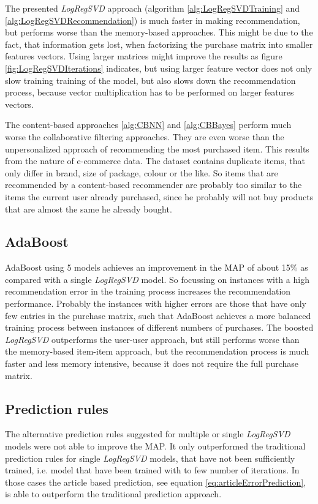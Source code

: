 \documentclass[10pt]{reportMaster}
\begin{document}
The presented \textit{LogRegSVD} approach (algorithm \ref{alg:LogRegSVDTraining} and \ref{alg:LogRegSVDRecommendation}) is much faster in making recommendation, but performs worse than the memory-based approaches.
This might be due to the fact, that information gets lost, when factorizing the purchase matrix into smaller features vectors.
Using larger matrices might improve the results as figure \ref{fig:LogRegSVDIterations} indicates, but using larger feature vector does not only slow training training of the model, but also slows down the recommendation process, because vector multiplication has to be performed on larger features vectors.

The content-based approaches \ref{alg:CBNN} and \ref{alg:CBBayes} perform much worse the collaborative filtering approaches.
They are even worse than the unpersonalized approach of recommending the most purchased item.
This results from the nature of e-commerce data.
The dataset contains duplicate items, that only differ in brand, size of package, colour or the like.
So items that are recommended by a content-based recommender are probably too similar to the items the current user already purchased, since he probably will not buy products that are almost the same he already bought.


\subsection{AdaBoost}
\label{sec:discAdaBoost}
AdaBoost using 5 models achieves an improvement in the MAP of about 15\% as compared with a single \textit{LogRegSVD} model.
So focussing on instances with a high recommendation error in the training process increases the recommendation performance.
Probably the instances with higher errors are those that have only few entries in the purchase matrix, such that AdaBoost achieves a more balanced training process between instances of different numbers of purchases.
The boosted \textit{LogRegSVD} outperforms the user-user approach, but still performs worse than the memory-based item-item approach, but the recommendation process is much faster and less memory intensive, because it does not require the full purchase matrix.


\subsection{Prediction rules}
\label{sec:discPredRules}
The alternative prediction rules suggested for multiple or single \textit{LogRegSVD} models were not able to improve the MAP.
It only outperformed the traditional prediction rules for single \textit{LogRegSVD} models, that have not been sufficiently trained, i.e. model that have been trained with to few number of iterations.
In those cases the article based prediction, see equation \ref{eq:articleErrorPrediction}, is able to outperform the traditional prediction approach.
\end{document}
